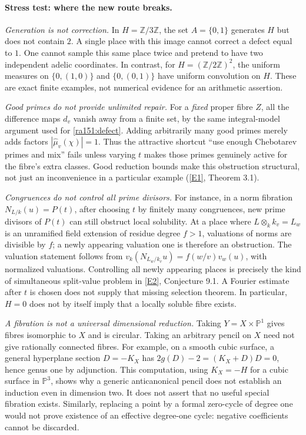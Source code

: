 \documentclass[11pt]{article}
\newcommand{\Z}{\mathbb{Z}}
\newcommand{\PP}{\mathbb P}
\newcommand{\eref}[2]{\hyperlink{extra:#1:#2}{[E#2]}}
\begin{document}
\paragraph{Stress test: where the new route breaks.}
\emph{Generation is not correction.}  In $H=\Z/3\Z$, the set $A=\{0,1\}$
generates $H$ but does not contain $2$.  A single place with this image cannot
correct a defect equal to $1$.  One cannot sample this same place twice and
pretend to have two independent adelic coordinates.  In contrast, for
$H=(\Z/2\Z)^2$, the uniform measures on $\{0,(1,0)\}$ and $\{0,(0,1)\}$
have uniform convolution on $H$.  These are exact finite examples, not
numerical evidence for an arithmetic assertion.

\emph{Good primes do not provide unlimited repair.}  For a \emph{fixed}
proper fibre $Z$, all the difference maps $d_v$ vanish away from a finite set,
by the same integral-model argument used for \eqref{ra151:defect}.  Adding
arbitrarily many good primes merely adds factors
$|\widehat\mu_v(\chi)|=1$.  Thus the attractive shortcut ``use enough
Chebotarev primes and mix'' fails unless varying $t$ makes those primes genuinely
active for the fibre's extra classes.  Good reduction bounds make this
obstruction structural, not just an inconvenience in a particular example
(\eref{151}{1}, Theorem 3.1).

\emph{Congruences do not control all prime divisors.}  For instance, in a norm
fibration $N_{L/k}(u)=P(t)$, after choosing $t$ by finitely many congruences,
new prime divisors of $P(t)$ can still obstruct local solubility.  At a place
where $L\otimes_k k_v=L_w$ is an unramified field extension of residue
degree $f>1$, valuations of norms are divisible by $f$; a newly appearing valuation one is therefore an
obstruction.  The valuation statement follows from
$v_k(N_{L_w/k_v}u)=f(w/v)v_w(u)$, with normalized valuations.  Controlling
all newly appearing places is precisely the kind of simultaneous split-value
problem in \eref{151}{2}, Conjecture 9.1.  A Fourier estimate after $t$ is
chosen does not supply that missing selection theorem.  In particular, $H=0$
does not by itself imply that a locally soluble fibre exists.

\emph{A fibration is not a universal dimensional reduction.}  Taking
$Y=X\times\PP^1$ gives fibres isomorphic to $X$ and is circular.  Taking an
arbitrary pencil on $X$ need not give rationally connected fibres.  For example,
on a smooth cubic surface, a general hyperplane section $D=-K_X$ has
$2g(D)-2=(K_X+D)D=0$, hence genus one by adjunction.  This computation, using $K_X=-H$ for a cubic surface in $\PP^3$, shows
why a generic anticanonical pencil does not establish an induction even in
dimension two.  It does not assert that no useful special fibration exists.
Similarly, replacing a point by a formal zero-cycle of degree one would not
prove existence of an effective degree-one cycle: negative coefficients cannot
be discarded.
\end{document}
